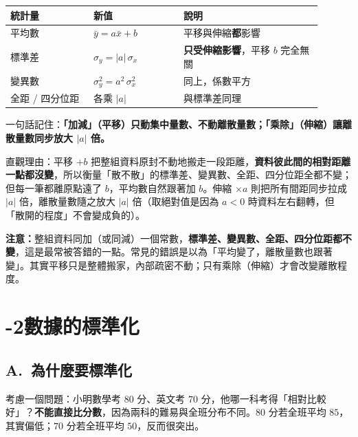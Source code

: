 \documentclass[11pt]{article}
\begin{document}
\begin{center}
\renewcommand{\arraystretch}{1.35}
\begin{tabular}{p{0.24\linewidth} p{0.26\linewidth} p{0.40\linewidth}}
\hline
\textbf{統計量} & \textbf{新值} & \textbf{說明} \\
\hline
平均數 & $\bar{y} = a\bar{x} + b$ & 平移與伸縮\textbf{都}影響 \\
標準差 & $\sigma_y = \lvert a\rvert\,\sigma_x$ & \textbf{只受伸縮影響}，平移 $b$ 完全無關 \\
變異數 & $\sigma_y^2 = a^2\,\sigma_x^2$ & 同上，係數平方 \\
全距 / 四分位距 & 各乘 $\lvert a\rvert$ & 與標準差同理 \\
\hline
\end{tabular}
\end{center}

一句話記住：\textbf{「加減」（平移）只動集中量數、不動離散量數；「乘除」（伸縮）讓離散量數同步放大 $\lvert a\rvert$ 倍。}

直觀理由：平移 $+b$ 把整組資料原封不動地搬走一段距離，\textbf{資料彼此間的相對距離一點都沒變}，所以衡量「散不散」的標準差、變異數、全距、四分位距全都不變；但每一筆都離原點遠了 $b$，平均數自然跟著加 $b$。伸縮 $\times a$ 則把所有間距同步拉成 $\lvert a\rvert$ 倍，離散量數隨之放大 $\lvert a\rvert$ 倍（取絕對值是因為 $a<0$ 時資料左右翻轉，但「散開的程度」不會變成負的）。


\textbf{注意：}整組資料同加（或同減）一個常數，\textbf{標準差、變異數、全距、四分位距都不變}，這是最常被答錯的一點。常見的錯誤是以為「平均變了，離散量數也跟著變」。其實平移只是整體搬家，內部疏密不動；只有乘除（伸縮）才會改變離散程度。

\section*{-2\quad 數據的標準化}

\subsection*{\sffamily A.\ 為什麼要標準化}

考慮一個問題：小明數學考 $80$ 分、英文考 $70$ 分，他哪一科考得「相對比較好」？\textbf{不能直接比分數}，因為兩科的難易與全班分布不同。$80$ 分若全班平均 $85$，其實偏低；$70$ 分若全班平均 $50$，反而很突出。
\end{document}
